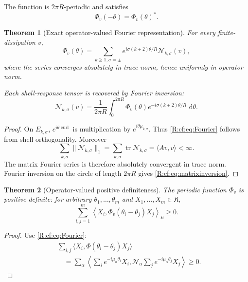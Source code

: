 \documentclass[
 aps,
 prd,
 reprint,
 amsmath,
 amssymb,
 nofootinbib,
 superscriptaddress
]{revtex4-2}
\newtheorem{theorem}{Theorem}[section]
\theoremstyle{definition}
\theoremstyle{remark}
\newcommand{\cK}{\mathfrak K}
\newcommand{\cN}{\mathscr N}
\newcommand{\curl}{\operatorname{curl}}
\newcommand{\dd}{\,\mathrm d}
\newcommand{\tr}{\operatorname{tr}}
\begin{document}
The function is $2\pi R$-periodic and satisfies
\[
       \Phi_v(-\theta)=\Phi_v(\theta)^*.
\]

\begin{theorem}[Exact operator-valued Fourier representation]
\label{R:cf:thm:Fourier}
For every finite-dissipation $v$,
\begin{equation}
 \boxed{
 \Phi_v(\theta)
 =
 \sum_{k\ge1,\sigma=\pm}
 e^{i\sigma(k+2)\theta/R}
 \cN_{k,\sigma}(v),
 }
 \label{R:cf:eq:Fourier}
\end{equation}
where the series converges absolutely in trace norm, hence uniformly in
operator norm.

Each shell-response tensor is recovered by Fourier inversion:
\begin{equation}
 \boxed{
 \cN_{k,\sigma}(v)
 =
 \frac{1}{2\pi R}
 \int_0^{2\pi R}
 \Phi_v(\theta)
 e^{-i\sigma(k+2)\theta/R}
 \,\dd\theta.
 }
 \label{R:cf:eq:matrixinversion}
\end{equation}
\end{theorem}

\begin{proof}
On $E_{k,\sigma}$,
$e^{i\theta\curl}$ is multiplication by
$e^{i\theta\mu_{k,\sigma}}$.
Thus \eqref{R:cf:eq:Fourier} follows from shell orthogonality.
Moreover
\[
 \sum_{k,\sigma}
 \|\cN_{k,\sigma}\|_1
 =
 \sum_{k,\sigma}
 \tr\cN_{k,\sigma}
 =
 \langle Av,v\rangle
 <\infty.
\]
The matrix Fourier series is therefore absolutely convergent in trace norm.
Fourier inversion on the circle of length $2\pi R$ gives
\eqref{R:cf:eq:matrixinversion}.
\end{proof}

\begin{theorem}[Operator-valued positive definiteness]
\label{R:cf:thm:positivefunction}
The periodic function $\Phi_v$ is positive definite: for arbitrary
$\theta_1,\ldots,\theta_m$ and
$X_1,\ldots,X_m\in\cK$,
\begin{equation}
 \boxed{
 \sum_{i,j=1}^m
 \left\langle
 X_i,
 \Phi_v(\theta_i-\theta_j)X_j
 \right\rangle_{\cK}
 \ge0.
 }
 \label{R:cf:eq:positivefunction}
\end{equation}
\end{theorem}

\begin{proof}
Use \eqref{R:cf:eq:Fourier}:
\[
\begin{aligned}
 &\sum_{i,j}
 \langle
 X_i,\Phi(\theta_i-\theta_j)X_j
 \rangle\\
 &\quad=
 \sum_\alpha
 \left\langle
 \sum_i e^{-i\mu_\alpha\theta_i}X_i,
 \cN_\alpha
 \sum_j e^{-i\mu_\alpha\theta_j}X_j
 \right\rangle
 \ge0.
\end{aligned}
\]
\end{proof}
\end{document}
